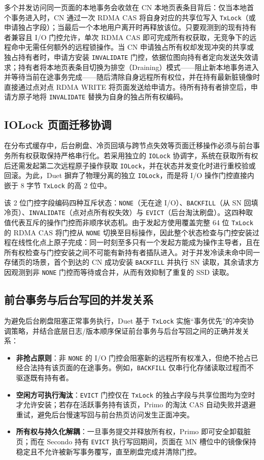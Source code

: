 多个并发访问同一页面的本地事务会收敛在 CN 本地页表条目背后：仅当本地首个事务进入时，CN 通过一次 RDMA CAS 将自身对应的共享位写入 \texttt{TxLock}（或申请独占字段）；当最后一个本地用户离开时再释放该位。只要观测到的现有持有者兼容且 I/O 门控允许，单次 RDMA CAS 即可完成所有权获取，无竞争下的远程命中无需任何额外的远程锁操作。当 CN 申请独占所有权却发现冲突的共享或独占持有者时，申请方安装 \texttt{INVALIDATE} 门控，依据位图向持有者定向发送失效请求；持有者将本地页表条目切换为排空（Draining）模式——阻止新本地事务进入并等待当前在途事务完成——随后清除自身远程所有权位，并在持有最新脏镜像时直接通过点对点 RDMA WRITE 将页面发送给申请方。待所有持有者排空后，申请方原子地将 \texttt{INVALIDATE} 替换为自身的独占所有权编码。

\subsection{IOLock 页面迁移协调}
在分布式缓存中，后台刷盘、冷页回填与跨节点失效等页面迁移操作必须与前台事务所有权获取保持严格串行化。若采用独立的 \texttt{IOLock} 协调字，系统在获取所有权后还需发起第二次远程原子操作获取 \texttt{IOLock}，并在状态并发变化时进行重校验或回滚\cite{xiangNomad2024}。为此，Duet 摒弃了物理分离的独立 \texttt{IOLock}，而是将 I/O 操作门控直接内嵌于 8 字节 \texttt{TxLock} 的高 2 位中。

该 2 位门控字段编码四种互斥状态：\texttt{NONE}（无在途 I/O）、\texttt{BACKFILL}（从 SN 回填冷页）、\texttt{INVALIDATE}（点对点所有权失效）与 \texttt{EVICT}（后台淘汰刷盘）。这四种取值代表互斥的操作门控而非顺序状态机。由于发起方使用覆盖完整 64 位 \texttt{TxLock} 的 RDMA CAS 将门控从 \texttt{NONE} 切换至目标操作，因此整个状态检查与门控安装过程在线性化点上原子完成：同一时刻至多只有一个发起方能成为操作主导者，且在所有权检查与门控安装之间不可能有新持有者插队进入。对于并发冷读未命中同一存储页的场景，首个到达的 CN 成功安装 \texttt{BACKFILL} 并执行 SN 读取，其余请求方因观测到非 \texttt{NONE} 门控而等待或合并，从而有效抑制了重复的 SSD 读取。

\subsection{前台事务与后台写回的并发关系}
为避免后台刷盘阻塞正常事务执行，Duet 基于 \texttt{TxLock} 实施“事务优先”的冲突协调策略，并结合底层日志/版本顺序保证前台事务与后台写回之间的正确并发关系\cite{bernsteinConcurrency1987,grayTransaction1993}：
\begin{itemize}
    \item \textbf{非抢占原则}：非 \texttt{NONE} 的 I/O 门控会阻塞新的远程所有权准入，但绝不抢占已经合法持有该页面的在途事务。例如，\texttt{BACKFILL} 仅串行化存储读取过程而不驱逐既有持有者。
    \item \textbf{空闲方可执行淘汰}：\texttt{EVICT} 门控仅在 \texttt{TxLock} 的独占字段与共享位图均为空时才允许安装；若存在活跃事务持有该页，Primo 的淘汰 CAS 自动失败并退避重试，避免后台慢速写回与前台热页访问发生正面冲突。
    \item \textbf{所有权与持久化解耦}：一旦事务提交并释放所有权，Primo 即可安全卸载脏页；而在 Secondo 持有 \texttt{EVICT} 执行写回期间，页面在 MN 槽位中的镜像保持稳定且不允许被新写事务覆写，直至刷盘完成并清除门控。
\end{itemize}

